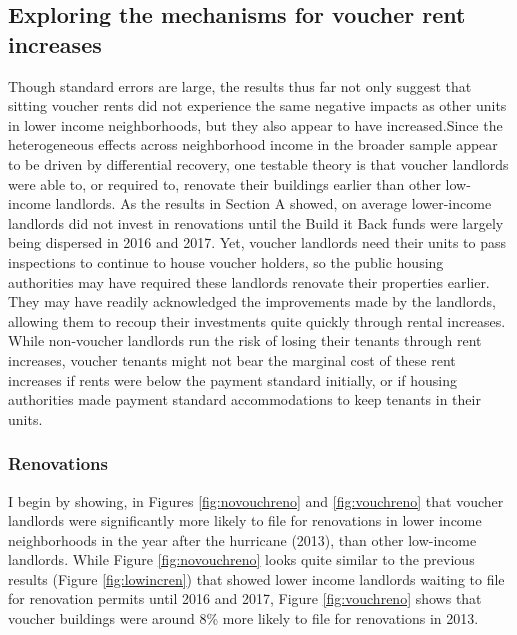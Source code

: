 \documentclass[12pt]{article}
\begin{document}
{{{{{\subsection{Exploring the mechanisms for voucher rent increases}
Though standard errors are large, the results thus far not only suggest that sitting voucher rents did not experience the same negative impacts as other units in lower income neighborhoods, but they also appear to have increased.Since the heterogeneous effects across neighborhood income in the broader sample appear to be driven by differential recovery, one testable theory is that voucher landlords were able to, or required to, renovate their buildings earlier than other low-income landlords. As the results in Section A showed, on average lower-income landlords did not invest in renovations until the Build it Back funds were largely being dispersed in 2016 and 2017.  Yet, voucher landlords need their units to pass inspections to continue to house voucher holders, so the public housing authorities may have required these landlords renovate their properties earlier. They may have readily acknowledged the improvements made by the landlords, allowing them to recoup their investments quite quickly through rental increases.  While non-voucher landlords run the risk of losing their tenants through rent increases, voucher tenants might not bear the marginal cost of these rent increases if rents were below the payment standard initially, or if housing authorities made payment standard accommodations to keep tenants in their units.

\subsubsection{Renovations}
 I begin by showing, in Figures \ref{fig:novouchreno} and \ref{fig:vouchreno} that voucher landlords were significantly more likely to file for renovations in lower income neighborhoods in the year after the hurricane (2013), than other low-income landlords.  While Figure \ref{fig:novouchreno} looks quite similar to the previous results (Figure \ref{fig:lowincren}) that showed lower income landlords waiting to file for renovation permits until 2016 and 2017, Figure \ref{fig:vouchreno} shows that voucher buildings were around 8\% more likely to file for renovations in 2013.   
 
}}}}}
\end{document}
